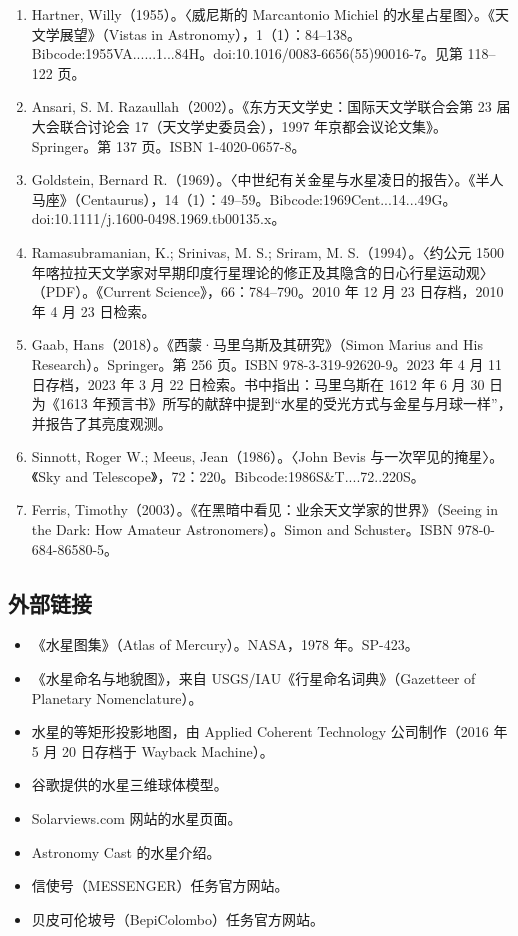 \begin{enumerate}
    \item Hartner, Willy（1955）。〈威尼斯的 Marcantonio Michiel 的水星占星图〉。《天文学展望》（Vistas in Astronomy），1（1）：84–138。Bibcode:1955VA......1...84H。doi:10.1016/0083-6656(55)90016-7。见第 118–122 页。
    \item Ansari, S. M. Razaullah（2002）。《东方天文学史：国际天文学联合会第 23 届大会联合讨论会 17（天文学史委员会），1997 年京都会议论文集》。Springer。第 137 页。ISBN 1-4020-0657-8。
    \item Goldstein, Bernard R.（1969）。〈中世纪有关金星与水星凌日的报告〉。《半人马座》（Centaurus），14（1）：49–59。Bibcode:1969Cent...14...49G。doi:10.1111/j.1600-0498.1969.tb00135.x。
    \item Ramasubramanian, K.; Srinivas, M. S.; Sriram, M. S.（1994）。〈约公元 1500 年喀拉拉天文学家对早期印度行星理论的修正及其隐含的日心行星运动观〉（PDF）。《Current Science》，66：784–790。2010 年 12 月 23 日存档，2010 年 4 月 23 日检索。
    \item Gaab, Hans（2018）。《西蒙·马里乌斯及其研究》（Simon Marius and His Research）。Springer。第 256 页。ISBN 978-3-319-92620-9。2023 年 4 月 11 日存档，2023 年 3 月 22 日检索。书中指出：马里乌斯在 1612 年 6 月 30 日为《1613 年预言书》所写的献辞中提到“水星的受光方式与金星与月球一样”，并报告了其亮度观测。
    \item Sinnott, Roger W.; Meeus, Jean（1986）。〈John Bevis 与一次罕见的掩星〉。《Sky and Telescope》，72：220。Bibcode:1986S&T....72..220S。
    \item Ferris, Timothy（2003）。《在黑暗中看见：业余天文学家的世界》（Seeing in the Dark: How Amateur Astronomers）。Simon and Schuster。ISBN 978-0-684-86580-5。
\end{enumerate}
\subsection{外部链接}
\begin{itemize}
\item 《水星图集》（Atlas of Mercury）。NASA，1978 年。SP-423。
\item 《水星命名与地貌图》，来自 USGS/IAU《行星命名词典》（Gazetteer of Planetary Nomenclature）。
\item 水星的等矩形投影地图，由 Applied Coherent Technology 公司制作（2016 年 5 月 20 日存档于 Wayback Machine）。
\item 谷歌提供的水星三维球体模型。
\item Solarviews.com 网站的水星页面。
\item Astronomy Cast 的水星介绍。
\item 信使号（MESSENGER）任务官方网站。
\item 贝皮可伦坡号（BepiColombo）任务官方网站。
\end{itemize}










